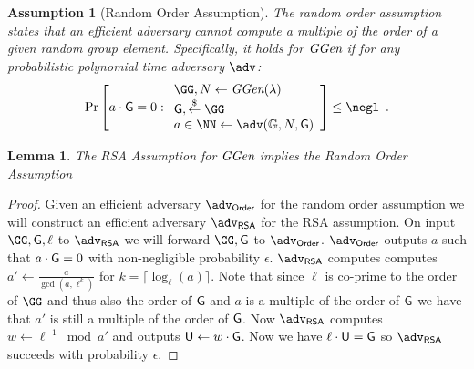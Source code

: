 \documentclass[10pt,conference]{IEEEtran}
\theoremstyle{Definition}
\newtheorem{lemma}{Lemma}
\newtheorem{assumption}{Assumption}
\begin{document}
\begin{assumption}[Random Order Assumption]
	The random order assumption states that an efficient adversary cannot compute a multiple of the order of a given random group element. Specifically, it holds for $\textit{GGen}$ if for any probabilistic polynomial time adversary $\adv$:
	\[
    \Pr\left[a\cdot \Generator =0:
    \begin{array}{l}
         \GG, N \leftarrow \ggen(\lambda)  \\
         \Generator, \sample \GG\\
         a \in \NN \leftarrow \adv(\mathbb{G},N, \Generator) \\
    \end{array}\right] \leq \negl \enspace .
    \]
\end{assumption}
\begin{lemma}
\label{lem:roa-to-rsa}
	The RSA Assumption for $\textit{GGen}$ implies the Random Order Assumption
	\end{lemma}
\begin{proof}
	Given an efficient adversary $\adv_{\textsf{Order}}$ for the random order assumption we will construct an efficient adversary $\adv_{\textsf{RSA}}$ for the RSA assumption. On input $\GG,\Generator,\ell$ to $\adv_{\textsf{RSA}}$ we will forward $\GG,\Generator$ to $\adv_{\textsf{Order}}$. $\adv_{\textsf{Order}}$ outputs $a$ such that $a\cdot \mathsf{G}=0$ with non-negligible probability $\epsilon$. 
	$\adv_{\textsf{RSA}}$ computes computes $a'\gets \frac{a}{\gcd(a,\ell^k)}$ for $k=\lceil\log_\ell(a)\rceil$. Note that since $\ell$ is co-prime to the order of $\GG$ and thus also the order of $\mathsf{G}$ and $a$ is a multiple of the order of $\mathsf{G}$ we have that $a'$ is still a multiple of the order of $\mathsf{G}$. Now $\adv_{\textsf{RSA}}$ computes $w\gets \ell^{-1} \bmod a'$ and outputs $\mathsf{U} \gets w\cdot \mathsf{G}$. Now we have $\ell \cdot \mathsf{U}=\mathsf{G}$ so $\adv_{\textsf{RSA}}$ succeeds with probability $\epsilon$.
\end{proof}
\end{document}
